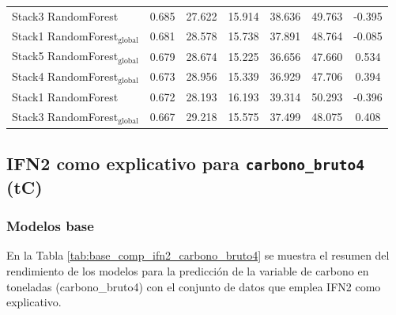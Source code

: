 \begin{table}[tp]
{\begin{tabular}{p{4.5cm}cccccc}
        Stack3 RandomForest & 0.685 & 27.622 & 15.914 & 38.636 & 49.763 & -0.395 \\
        Stack1 RandomForest$_{\text{global}}$ & 0.681 & 28.578 & 15.738 & 37.891 & 48.764 & -0.085 \\
        Stack5 RandomForest$_{\text{global}}$ & 0.679 & 28.674 & 15.225 & 36.656 & 47.660 & 0.534 \\
        Stack4 RandomForest$_{\text{global}}$ & 0.673 & 28.956 & 15.339 & 36.929 & 47.706 & 0.394 \\
        Stack1 RandomForest & 0.672 & 28.193 & 16.193 & 39.314 & 50.293 & -0.396 \\
        Stack3 RandomForest$_{\text{global}}$ & 0.667 & 29.218 & 15.575 & 37.499 & 48.075 & 0.408 \\
            \bottomrule
    \end{tabular}
    }
\end{table}


\clearpage
\subsection{IFN2 como explicativo para \texttt{carbono\_bruto4} (tC)}

\subsubsection{Modelos base}

En la Tabla \ref{tab:base_comp_ifn2_carbono_bruto4} se muestra el resumen del rendimiento de los modelos para la predicción de la variable de carbono en toneladas (carbono\_bruto4) con el conjunto de datos que emplea IFN2 como explicativo.

